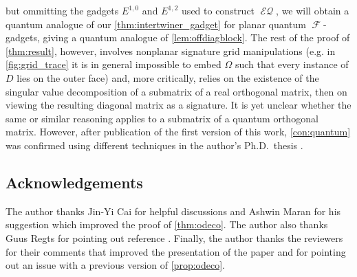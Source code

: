 \documentclass{article}
\DeclareMathOperator{\fc}{\mathcal{F}}
\DeclareMathOperator{\eq}{\mathcal{EQ}}
\begin{document}
but ommitting the gadgets $E^{1,0}$ and $E^{1,2}$ used to construct $\eq$, we will obtain a quantum analogue
of our \autoref{thm:intertwiner_gadget} for planar quantum $\fc$-gadgets, giving a quantum
analogue of \autoref{lem:offdiagblock}. The rest of the proof of \autoref{thm:result}, however, involves
nonplanar signature grid manipulations (e.g. in \autoref{fig:grid_trace} it is in general impossible to embed $\Omega$ such that 
every instance of $D$ lies on the outer face) and, more critically, relies on the existence of the
singular value decomposition of a submatrix of a real orthogonal matrix, then on viewing the resulting
diagonal matrix as a signature. It is yet unclear whether the same or similar reasoning applies to a
submatrix of a quantum orthogonal matrix. However, after publication of the first version
\cite{orthogonal} of this work, \autoref{con:quantum} was confirmed using different
techniques in the author's Ph.D.~thesis \cite{young_thesis}.



\subsection*{Acknowledgements}
The author thanks Jin-Yi Cai for helpful discussions and Ashwin Maran for his suggestion which
improved the proof of \autoref{thm:odeco}. The author also thanks Guus Regts for pointing out
reference \cite{schrijver_graph_2008}. Finally, the author thanks the reviewers for their
comments that improved the presentation of the paper and for pointing out an issue
with a previous version of \autoref{prop:odeco}.



\newpage
\appendix
\end{document}
